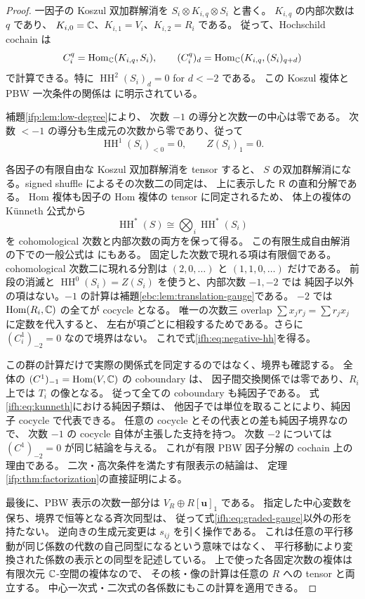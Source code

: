 \begin{proof}
一因子の Koszul 双加群解消を
$S_i\otimes K_{i,q}\otimes S_i$ と書く。
$K_{i,q}$ の内部次数は $q$ であり、
$K_{i,0}=\mathbb C$、$K_{i,1}=V_i$、$K_{i,2}=R_i$ である。
従って、Hochschild cochain は
\[
 C_i^q=\operatorname{Hom}_{\mathbb C}(K_{i,q},S_i),\qquad
 (C_i^q)_d=\operatorname{Hom}_{\mathbb C}
               (K_{i,q},(S_i)_{q+d})
\]
で計算できる。特に $\operatorname{HH}^2(S_i)_d=0$ for $d<-2$ である。
この Koszul 複体と PBW 一次条件の関係は
\cite[Sections~3.3, 3.6 and 4.3]{CMOBravermanGaitsgory}に明示されている。

補題\ref{ifp:lem:low-degree}により、
次数 $-1$ の導分と次数一の中心は零である。
次数 $<-1$ の導分も生成元の次数から零であり、従って
\[
       \operatorname{HH}^1(S_i)_{<0}=0,\qquad Z(S_i)_1=0.
\]

各因子の有限自由な Koszul 双加群解消を tensor すると、
$S$ の双加群解消になる。signed shuffle によるその次数二の同定は、
上に表示した $\mathsf R$ の直和分解である。
Hom 複体も因子の Hom 複体の tensor に同定されるため、
体上の複体の K\"unneth 公式から
\begin{equation}\label{ifh:eq:kunneth}
 \operatorname{HH}^*(S)
      \cong\bigotimes_i\operatorname{HH}^*(S_i)
\end{equation}
を cohomological 次数と内部次数の両方を保って得る。
この有限生成自由解消の下での一般公式は
\cite[Theorem~3.1.2]{CMOWitherspoonHochschild}にもある。
固定した次数で現れる項は有限個である。
cohomological 次数二に現れる分割は $(2,0,\ldots)$ と $(1,1,0,\ldots)$ だけである。
前段の消滅と $\operatorname{HH}^0(S_i)=Z(S_i)$ を使うと、内部次数 $-1,-2$ では
純因子以外の項はない。$-1$ の計算は補題\ref{ebc:lem:translation-gauge}である。
$-2$ では $\operatorname{Hom}(R_i,\mathbb C)$ の全てが cocycle となる。
唯一の次数三 overlap $\sum x_jr_j=\sum r_jx_j$ に定数を代入すると、
左右が項ごとに相殺するためである。さらに $(C_i^1)_{-2}=0$ なので境界はない。
これで式\eqref{ifh:eq:negative-hh}を得る。

この群の計算だけで実際の関係式を同定するのではなく、境界も確認する。
全体の $(C^1)_{-1}=\operatorname{Hom}(V,\mathbb C)$ の coboundary は、
因子間交換関係では零であり、$R_i$ 上では $T_i$ の像となる。
従って全ての coboundary も純因子である。
式\eqref{ifh:eq:kunneth}における純因子類は、
他因子では単位を取ることにより、純因子 cocycle で代表できる。
任意の cocycle とその代表との差も純因子境界なので、
次数 $-1$ の cocycle 自体が主張した支持を持つ。
次数 $-2$ については $(C^1)_{-2}=0$ が同じ結論を与える。
これが有限 PBW 因子分解の cochain 上の理由である。
二次・高次条件を満たす有限表示の結論は、
定理\ref{ifp:thm:factorization}の直接証明による。

最後に、PBW 表示の次数一部分は $V_R\oplus R[\mathbf u]_1$ である。
指定した中心変数を保ち、境界で恒等となる斉次同型は、
従って式\eqref{ifh:eq:graded-gauge}以外の形を持たない。
逆向きの生成元変更は $s_{ij}$ を引く操作である。
これは任意の平行移動が同じ係数の代数の自己同型になるという意味ではなく、
平行移動により変換された係数の表示との同型を記述している。
上で使った各固定次数の複体は有限次元 $\mathbb C$-空間の複体なので、
その核・像の計算は任意の $R$ への tensor と両立する。
中心一次式・二次式の各係数にもこの計算を適用できる。
\end{proof}

